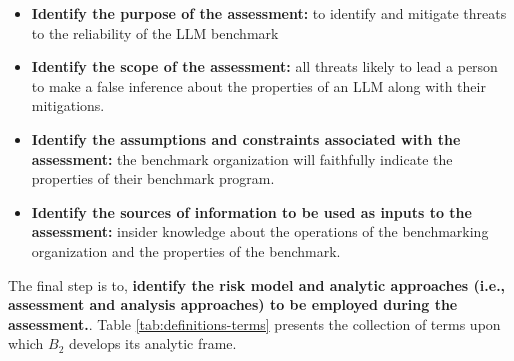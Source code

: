 \documentclass{article}
\newcommand\bb{$B_2$ }
\begin{document}
\begin{itemize}
    \item {\bf Identify the purpose of the assessment:} to identify and mitigate threats to the reliability of the LLM benchmark
    \item {\bf Identify the scope of the assessment:} all threats likely to lead a person to make a false inference about the properties of an LLM along with their mitigations.
    \item {\bf Identify the assumptions and constraints associated with the assessment:} the benchmark organization will faithfully indicate the properties of their benchmark program.
    \item {\bf Identify the sources of information to be used as inputs to the assessment:} insider knowledge about the operations of the benchmarking organization and the properties of the benchmark.
\end{itemize}

The final step is to, {\bf identify the risk model and analytic approaches (i.e., assessment and analysis approaches) to be employed during the assessment.}. Table \ref{tab:definitions-terms} presents the collection of terms upon which \bb develops its analytic frame.
\end{document}
